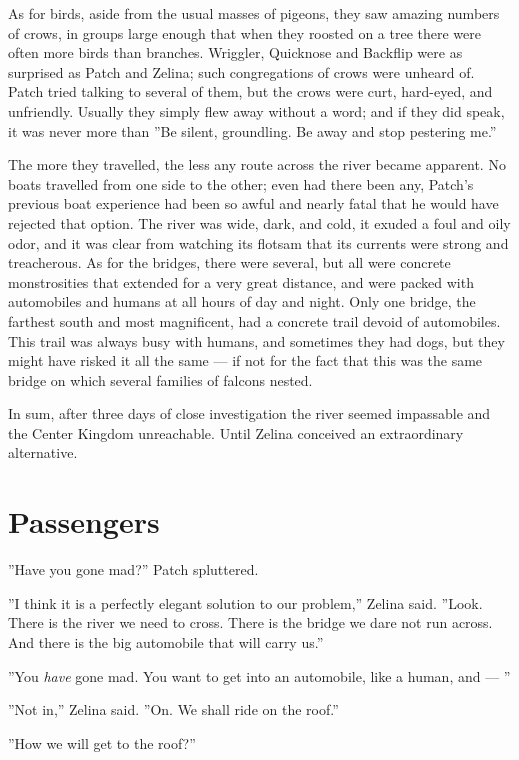 \documentclass[12pt]{book}
\begin{document}
As for birds, aside from the usual masses of pigeons, they saw amazing numbers of crows, in groups large enough that when they roosted on a tree there were often more birds than branches. Wriggler, Quicknose and Backflip were as surprised as Patch and Zelina; such congregations of crows were unheard of. Patch tried talking to several of them, but the crows were curt, hard-eyed, and unfriendly. Usually they simply flew away without a word; and if they did speak, it was never more than ''Be silent, groundling. Be away and stop pestering me.''

The more they travelled, the less any route across the river became apparent. No boats travelled from one side to the other; even had there been any, Patch's previous boat experience had been so awful and nearly fatal that he would have rejected that option. The river was wide, dark, and cold, it exuded a foul and oily odor, and it was clear from watching its flotsam that its currents were strong and treacherous. As for the bridges, there were several, but all were concrete monstrosities that extended for a very great distance, and were packed with automobiles and humans at all hours of day and night. Only one bridge, the farthest south and most magnificent, had a concrete trail devoid of automobiles. This trail was always busy with humans, and sometimes they had dogs, but they might have risked it all the same ---
if not for the fact that this was the same bridge on which several families of falcons nested.

In sum, after three days of close investigation the river seemed impassable and the Center Kingdom unreachable. Until Zelina conceived an extraordinary alternative.


\section{Passengers}

''Have you gone mad?'' Patch spluttered.

''I think it is a perfectly elegant solution to our problem,'' Zelina said. ''Look. There is the river we need to cross. There is the bridge we dare not run across. And there is the big automobile that will carry us.''

''You {\it have} gone mad. You want to get into an automobile, like a human, and ---
''

''Not in,'' Zelina said. ''On. We shall ride on the roof.''

''How we will get to the roof?''
\end{document}
